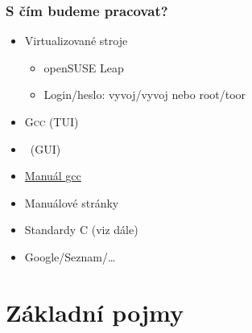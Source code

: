 \begin{frame}
  \frametitle{S čím budeme pracovat?}

  \begin{itemize}
    \item Virtualizované stroje
    \begin{itemize}
      \item openSUSE Leap
      \item Login/heslo: vyvoj/vyvoj nebo root/toor
    \end{itemize}
  \end{itemize}

  \pause
  \medskip

  \begin{itemize}
    \item \textsc{Gcc} (TUI)
    \item \qtc\ (GUI)
  \end{itemize}

  \pause
  \medskip

  \begin{itemize}
    \item \href{https://gcc.gnu.org/onlinedocs/}{Manuál gcc}
    \item Manuálové stránky
    \item Standardy C (viz dále)

    \pause

    \item Google/Seznam/\dots
  \end{itemize}

\end{frame}

\section{Základní pojmy}
\frame{\sectionpage}


